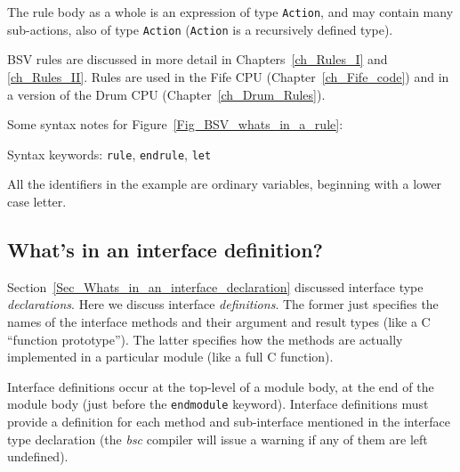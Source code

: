 The rule body as a whole is an expression of type \verb|Action|, and
may contain many sub-actions, also of type \verb|Action|
(\verb|Action| is a recursively defined type).

BSV rules are discussed in more detail in Chapters~\ref{ch_Rules_I}
and \ref{ch_Rules_II}.  Rules are used in the Fife CPU
(Chapter~\ref{ch_Fife_code}) and in a version of the Drum CPU
(Chapter~\ref{ch_Drum_Rules}).

Some syntax notes for Figure~\ref{Fig_BSV_whats_in_a_rule}:

\begin{tightlist}

 \item Syntax keywords: \verb|rule|, \verb|endrule|, \verb|let|

 \item All the identifiers in the example are ordinary variables,
       beginning with a lower case letter.

\end{tightlist}


\subsection{What's in an interface definition?}

\label{Sec_Whats_in_an_interface_definition}


Section~\ref{Sec_Whats_in_an_interface_declaration} discussed
interface type \emph{declarations}.  Here we discuss interface
\emph{definitions}.  The former just specifies the names of the
interface methods and their argument and result types (like a C
``function prototype'').  The latter specifies how the methods are
actually implemented in a particular module (like a full C function).

Interface definitions occur at the top-level of a module body, at the
end of the module body (just before the \verb|endmodule| keyword).
Interface definitions must provide a definition for each method and
sub-interface mentioned in the interface type declaration (the
\emph{bsc} compiler will issue a warning if any of them are left
undefined).

